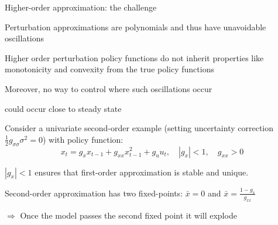 \begin{frame}{Higher-order approximation: the challenge}

  \begin{witemize}
    \item Perturbation approximations are polynomials and thus have unavoidable oscillations
    \item Higher order perturbation policy functions do not inherit properties like monotonicity and convexity from the true policy functions
    \item Moreover, no way to control where such oscillations occur
    \item[$\rightarrow$] could occur close to steady state
    \item Consider a univariate second-order example (setting uncertainty correction $\frac{1}{2}g_{\sigma\sigma}\sigma^2=0$) with policy function:
    \begin{equation}
      x_t = g_x x_{t-1} + g_{xx} x_{t-1}^2 + g_u u_t, \quad |g_x| < 1, \quad g_{xx} > 0
    \end{equation}

    \item $|g_x| < 1$ ensures that first-order approximation is stable and unique.

    \item Second-order approximation has two fixed-points: $\bar{x} = 0$ and $\bar{x} = \frac{1 - g_x}{g_{xx}}$

    $\Rightarrow$ Once the model passes the second fixed point it will explode

  \end{witemize}

\end{frame}


